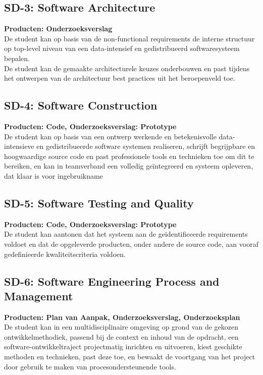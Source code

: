 \subsection{SD-3: Software Architecture}
\textbf{Producten: Onderzoeksverslag} \\
De student kan op basis van de non-functional requirements de interne structuur op top-level niveau van een data-intensief en gedistribueerd softwaresysteem bepalen.
\\
De student kan de gemaakte architecturele keuzes onderbouwen en past tijdens het ontwerpen van de architectuur best practices uit het beroepenveld toe.

\subsection{SD-4: Software Construction}
\textbf{Producten: Code, Onderzoeksverslag: Prototype} \\
De student kan op basis van een ontwerp werkende en betekenisvolle data- intensieve en gedistribueerde software systemen realiseren, schrijft begrijpbare en hoogwaardige source code en past professionele tools en technieken toe om dit te bereiken, en kan in teamverband een volledig geïntegreerd en systeem opleveren, dat klaar is voor ingebruikname

\subsection{SD-5: Software Testing and Quality}
\textbf{Producten: Code, Onderzoeksverslag: Prototype} \\
De student kan aantonen dat het systeem aan de geïdentificeerde requirements voldoet en dat de opgeleverde producten, onder andere de source code, aan vooraf gedefinieerde kwaliteitscriteria voldoen.

\subsection{SD-6: Software Engineering Process and Management}
\textbf{Producten: Plan van Aanpak, Onderzoeksverslag, Onderzoeksplan} \\
De student kan in een multidisciplinaire omgeving op grond van de gekozen ontwikkelmethodiek, passend bij de context en inhoud van de opdracht, een software-ontwikkeltraject projectmatig inrichten en uitvoeren, kiest geschikte methoden en technieken, past deze toe, en bewaakt de voortgang van het project door gebruik te maken van procesondersteunende tools.

